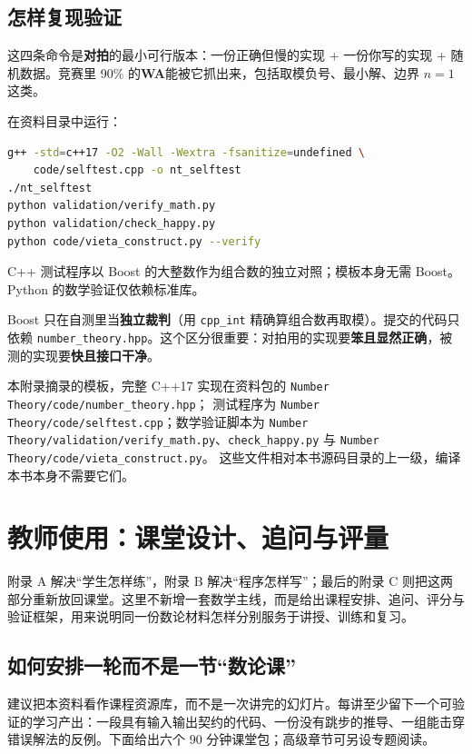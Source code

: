 \section{怎样复现验证}

\begin{tip}
这四条命令是\textbf{对拍}的最小可行版本：一份正确但慢的实现 + 一份你写的实现 + 随机数据。竞赛里 90\% 的\textbf{WA}能被它抓出来，包括取模负号、最小解、边界 $n=1$ 这类。
\end{tip}

在资料目录中运行：
\begin{lstlisting}[language=bash]
g++ -std=c++17 -O2 -Wall -Wextra -fsanitize=undefined \
    code/selftest.cpp -o nt_selftest
./nt_selftest
python validation/verify_math.py
python validation/check_happy.py
python code/vieta_construct.py --verify
\end{lstlisting}
C++ 测试程序以 Boost 的大整数作为组合数的独立对照；模板本身无需 Boost。Python 的数学验证仅依赖标准库。

\begin{tip}
Boost 只在自测里当\textbf{独立裁判}（用 \texttt{cpp\_int} 精确算组合数再取模）。提交的代码只依赖 \texttt{number\_theory.hpp}。这个区分很重要：对拍用的实现要\textbf{笨且显然正确}，被测的实现要\textbf{快且接口干净}。
\end{tip}



\begin{tip}[代码与验证脚本的位置]
本附录摘录的模板，完整 C++17 实现在资料包的 \texttt{Number Theory/code/number\_theory.hpp}；
测试程序为 \texttt{Number Theory/code/selftest.cpp}；数学验证脚本为
\texttt{Number Theory/validation/verify\_math.py}、\texttt{check\_happy.py}
与 \texttt{Number Theory/code/vieta\_construct.py}。
这些文件相对本书源码目录的上一级，编译本书本身不需要它们。
\end{tip}

\chapter{教师使用：课堂设计、追问与评量}
\begin{chapterintro}[章节导读]
附录 A 解决“学生怎样练”，附录 B 解决“程序怎样写”；最后的附录 C 则把这两部分重新放回课堂。这里不新增一套数学主线，而是给出课程安排、追问、评分与验证框架，用来说明同一份数论材料怎样分别服务于讲授、训练和复习。
\end{chapterintro}

\section{如何安排一轮而不是一节“数论课”}
建议把本资料看作课程资源库，而不是一次讲完的幻灯片。每讲至少留下一个可验证的学习产出：一段具有输入输出契约的代码、一份没有跳步的推导、一组能击穿错误解法的反例。下面给出六个 $90$ 分钟课堂包；高级章节可另设专题阅读。


